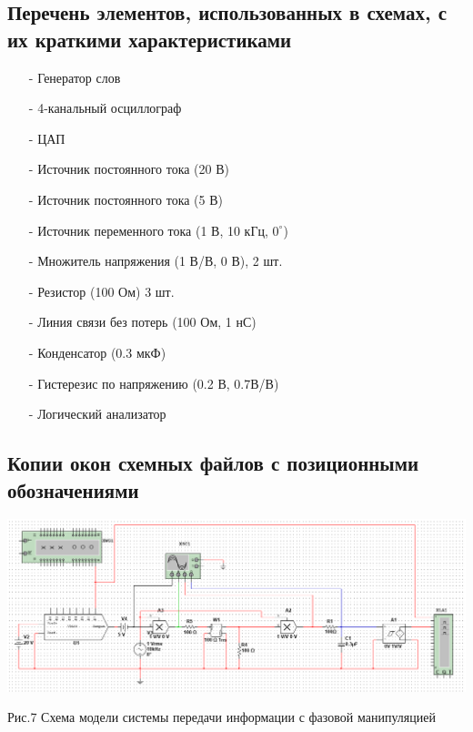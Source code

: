 \documentclass[11pt]{article}
\begin{document}
\subsection{Перечень элементов, использованных в схемах, с
их краткими характеристиками}
\begin{itemize}
    \item[-] Генератор слов 
    \item[-] 4-канальный осциллограф
    \item[-] ЦАП
    \item[-] Источник постоянного тока (20 В)
    \item[-] Источник постоянного тока (5 В)
    \item[-] Источник переменного тока (1 В, 10 кГц, $0^\circ$)
    \item[-] Множитель напряжения (1 В/В, 0 В), 2 шт. 
    \item[-] Резистор (100 Ом) 3 шт.
    \item[-] Линия связи без потерь (100 Ом, 1 нС)
    \item[-] Конденсатор (0.3 мкФ)
    \item[-] Гистерезис по напряжению (0.2 В, 0.7В/В)
    \item[-] Логический анализатор
\end{itemize}


\subsection{Копии окон схемных файлов с позиционными обозначениями}
\includegraphics[width=1\linewidth]{img/scheme3.png}
\begin{center}
    Рис.7 Схема модели системы передачи информации с фазовой манипуляцией
\end{center}
\end{document}
